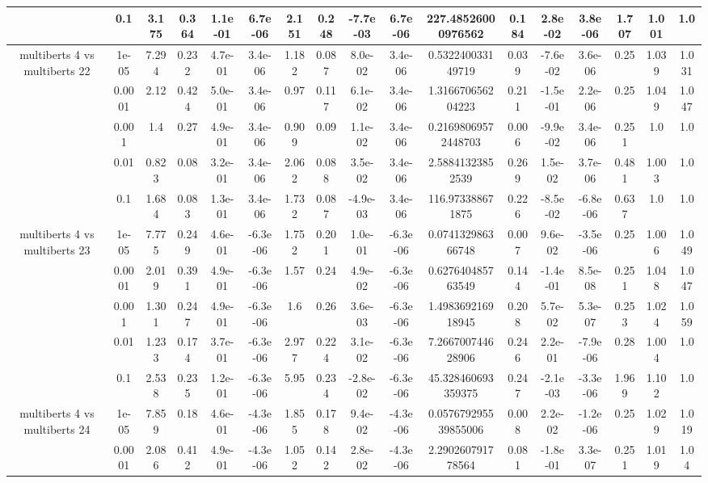 \begin{tabular}{|c|c|c|c|c|c|c|c|c|c|c|c|c|c|c|c|c|}
 & 0.1 & 3.175 & 0.364 & 1.1e-01 & 6.7e-06 & 2.151 & 0.248 & -7.7e-03 & 6.7e-06 & 227.48526000976562 & 0.184 & 2.8e-02 & 3.8e-06 & 1.707 & 1.001 & 1.0 \\
\hline
\multirow{5}{*}{multiberts 4 vs multiberts 22} & 1e-05 & 7.294 & 0.232 & 4.7e-01 & 3.4e-06 & 1.182 & 0.087 & 8.0e-02 & 3.4e-06 & 0.532240033149719 & 0.039 & -7.6e-02 & 3.6e-06 & 0.25 & 1.039 & 1.031 \\
 & 0.0001 & 2.12 & 0.424 & 5.0e-01 & 3.4e-06 & 0.97 & 0.117 & 6.1e-02 & 3.4e-06 & 1.316670656204223 & 0.211 & -1.5e-01 & 2.2e-06 & 0.25 & 1.049 & 1.047 \\
 & 0.001 & 1.4 & 0.27 & 4.9e-01 & 3.4e-06 & 0.909 & 0.09 & 1.1e-02 & 3.4e-06 & 0.21698069572448703 & 0.006 & -9.9e-02 & 3.4e-06 & 0.251 & 1.0 & 1.0 \\
 & 0.01 & 0.823 & 0.08 & 3.2e-01 & 3.4e-06 & 2.062 & 0.088 & 3.5e-02 & 3.4e-06 & 2.58841323852539 & 0.269 & 1.5e-02 & 3.7e-06 & 0.481 & 1.003 & 1.0 \\
 & 0.1 & 1.684 & 0.083 & 1.3e-01 & 3.4e-06 & 1.732 & 0.087 & -4.9e-03 & 3.4e-06 & 116.973388671875 & 0.226 & -8.5e-02 & -6.8e-06 & 0.637 & 1.0 & 1.0 \\
\hline
\multirow{5}{*}{multiberts 4 vs multiberts 23} & 1e-05 & 7.775 & 0.249 & 4.6e-01 & -6.3e-06 & 1.752 & 0.201 & 1.0e-01 & -6.3e-06 & 0.074132986366748 & 0.007 & 9.6e-02 & -3.5e-06 & 0.25 & 1.006 & 1.049 \\
 & 0.0001 & 2.019 & 0.391 & 4.9e-01 & -6.3e-06 & 1.57 & 0.24 & 4.9e-02 & -6.3e-06 & 0.627640485763549 & 0.144 & -1.4e-01 & 8.5e-08 & 0.251 & 1.048 & 1.047 \\
 & 0.001 & 1.301 & 0.247 & 4.9e-01 & -6.3e-06 & 1.6 & 0.26 & 3.6e-03 & -6.3e-06 & 1.498369216918945 & 0.208 & 5.7e-02 & 5.3e-07 & 0.253 & 1.024 & 1.059 \\
 & 0.01 & 1.233 & 0.174 & 3.7e-01 & -6.3e-06 & 2.977 & 0.224 & 3.1e-02 & -6.3e-06 & 7.266700744628906 & 0.246 & 2.2e-01 & -7.9e-06 & 0.28 & 1.004 & 1.0 \\
 & 0.1 & 2.538 & 0.235 & 1.2e-01 & -6.3e-06 & 5.95 & 0.234 & -2.8e-02 & -6.3e-06 & 45.328460693359375 & 0.247 & -2.1e-03 & -3.3e-06 & 1.969 & 1.102 & 1.0 \\
\hline
\multirow{5}{*}{multiberts 4 vs multiberts 24} & 1e-05 & 7.859 & 0.18 & 4.6e-01 & -4.3e-06 & 1.855 & 0.178 & 9.4e-02 & -4.3e-06 & 0.057679295539855006 & 0.008 & 2.2e-02 & -1.2e-06 & 0.25 & 1.029 & 1.019 \\
 & 0.0001 & 2.086 & 0.412 & 4.9e-01 & -4.3e-06 & 1.052 & 0.142 & 2.8e-02 & -4.3e-06 & 2.290260791778564 & 0.081 & -1.8e-01 & 3.3e-07 & 0.251 & 1.019 & 1.04 \\

\end{tabular}
